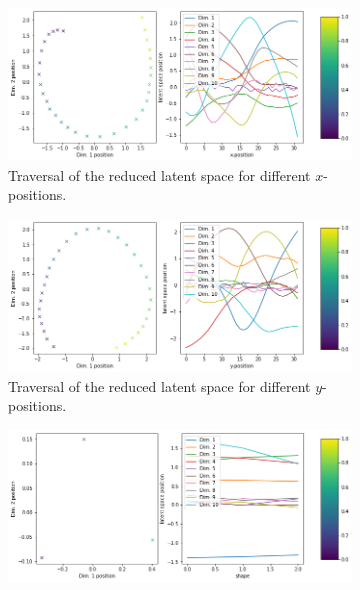 \documentclass[11pt,a4paper]{article}
\begin{document}
\begin{figure}[H]
\centering
\begin{subfigure}{.48\textwidth}
\includegraphics[width=\textwidth]{images/latent_space_traversals/vae_7500_dsprites_latent_space_values_x_position.png}
\caption{Traversal of the reduced latent space for different $x$-positions.}
\end{subfigure}
\begin{subfigure}{.48\textwidth}
\includegraphics[width=\textwidth]{images/latent_space_traversals/vae_7500_dsprites_latent_space_values_y_position.png}
\caption{Traversal of the reduced latent space for different $y$-positions.}
\end{subfigure}
\begin{subfigure}{.48\textwidth}
\includegraphics[width=\textwidth]{images/latent_space_traversals/vae_7500_dsprites_latent_space_values_shape.png}

\end{subfigure}
\end{figure}
\end{document}
